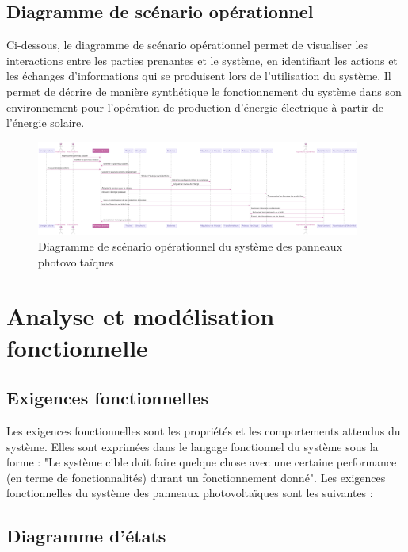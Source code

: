 \documentclass{article}
\begin{document}
\subsection{Diagramme de scénario opérationnel}
Ci-dessous, le diagramme de scénario opérationnel permet de visualiser les interactions entre les parties prenantes et le système, en identifiant les actions et les échanges d'informations qui se produisent lors de l'utilisation du système. Il permet de décrire de manière synthétique le fonctionnement du système dans son environnement pour l'opération de production d'énergie électrique à partir de l'énergie solaire. 
\vspace{10pt}
\begin{figure}[H]
    \centering
    \includegraphics[width=0.95\textwidth]{diagramme_de_scenario_operationnel.png}
    \caption{Diagramme de scénario opérationnel du système des panneaux photovoltaïques}
    \label{fig:diagramme_contexte}
\end{figure}
\vspace{10pt}


\section{Analyse et modélisation fonctionnelle}



\subsection{Exigences fonctionnelles}
Les exigences fonctionnelles sont les propriétés et les comportements attendus du système. Elles sont exprimées dans le langage fonctionnel du système sous la forme : "Le système cible doit faire quelque chose avec une certaine performance (en terme de fonctionnalités) durant un fonctionnement donné". Les exigences fonctionnelles du système des panneaux photovoltaïques sont les suivantes :

\clearpage

\subsection{Diagramme d'états}
\end{document}
